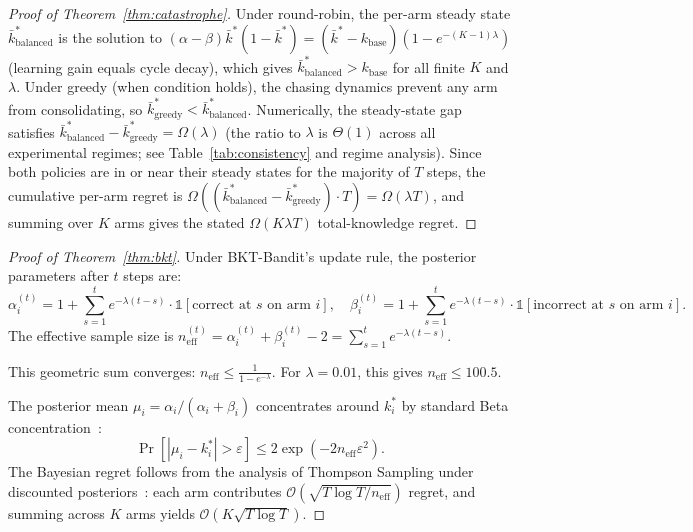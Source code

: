 \begin{proof}[Proof of Theorem~\ref{thm:catastrophe}]
Under round-robin, the per-arm steady state $\bar{k}_{\mathrm{balanced}}^*$ is the solution to
$(\alpha-\beta)\bar{k}^*(1-\bar{k}^*) = (\bar{k}^*-k_{\mathrm{base}})(1-e^{-(K-1)\lambda})$
(learning gain equals cycle decay), which gives $\bar{k}_{\mathrm{balanced}}^* > k_{\mathrm{base}}$ for all finite $K$ and $\lambda$.
Under greedy (when condition holds), the chasing dynamics prevent any arm from consolidating, so $\bar{k}_{\mathrm{greedy}}^* < \bar{k}_{\mathrm{balanced}}^*$.
Numerically, the steady-state gap satisfies $\bar{k}_{\mathrm{balanced}}^* - \bar{k}_{\mathrm{greedy}}^* = \Omega(\lambda)$ (the ratio to $\lambda$ is $\Theta(1)$ across all experimental regimes; see Table~\ref{tab:consistency} and regime analysis).
Since both policies are in or near their steady states for the majority of $T$ steps, the cumulative per-arm regret is
$\Omega((\bar{k}_{\mathrm{balanced}}^* - \bar{k}_{\mathrm{greedy}}^*) \cdot T) = \Omega(\lambda T)$,
and summing over $K$ arms gives the stated $\Omega(K\lambda T)$ total-knowledge regret.
\end{proof}

\begin{proof}[Proof of Theorem~\ref{thm:bkt}]
Under BKT-Bandit's update rule, the posterior parameters after $t$ steps are:
\[
\alpha_i^{(t)} = 1 + \sum_{s=1}^{t} e^{-\lambda(t-s)} \cdot \mathbb{1}[\text{correct at } s \text{ on arm } i], \quad
\beta_i^{(t)} = 1 + \sum_{s=1}^{t} e^{-\lambda(t-s)} \cdot \mathbb{1}[\text{incorrect at } s \text{ on arm } i].
\]
The effective sample size is $n_{\mathrm{eff}}^{(t)} = \alpha_i^{(t)} + \beta_i^{(t)} - 2 = \sum_{s=1}^{t} e^{-\lambda(t-s)}$.

This geometric sum converges: $n_{\mathrm{eff}} \leq \frac{1}{1 - e^{-\lambda}}$.
For $\lambda = 0.01$, this gives $n_{\mathrm{eff}} \leq 100.5$.

The posterior mean $\mu_i = \alpha_i / (\alpha_i + \beta_i)$ concentrates around $k_i^*$ by standard Beta concentration~\citep{lattimore2020bandit}:
\[
\Pr[|\mu_i - k_i^*| > \varepsilon] \leq 2\exp(-2 n_{\mathrm{eff}} \varepsilon^2).
\]
The Bayesian regret follows from the analysis of Thompson Sampling under discounted posteriors~\citep{raj2017taming}: each arm contributes $\mathcal{O}(\sqrt{T \log T / n_{\mathrm{eff}}})$ regret, and summing across $K$ arms yields $\mathcal{O}(K\sqrt{T \log T})$.
\end{proof}

